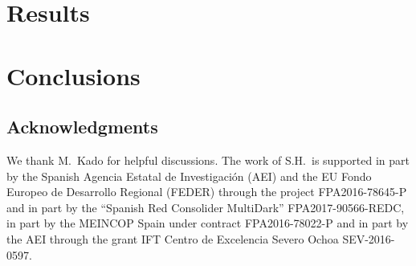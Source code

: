 \documentclass[12pt]{article}
\begin{document}


\section{Results}
\label{sec:results}



\section {Conclusions}
\label{sec:conclusion}



\subsection*{Acknowledgments}

We thank
M.~Kado
for helpful discussions.
The work of S.H.\ is supported in part by the
Spanish Agencia Estatal de Investigaci{\' o}n (AEI) and the EU Fondo Europeo de
Desarrollo Regional (FEDER) through the project FPA2016-78645-P and in part by
the “Spanish Red Consolider MultiDark” FPA2017-90566-REDC, in
part by the MEINCOP Spain under contract FPA2016-78022-P and in part by
the AEI through the grant IFT Centro de Excelencia Severo Ochoa SEV-2016-0597.
  
\end{document}
